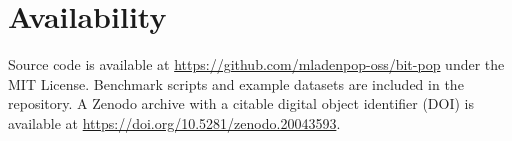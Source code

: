 \documentclass[10pt]{article}
\begin{document}
\section*{Availability}

Source code is available at \url{https://github.com/mladenpop-oss/bit-pop} under the MIT License. Benchmark scripts and example datasets are included in the repository. A Zenodo archive with a citable digital object identifier (DOI) is available at \url{https://doi.org/10.5281/zenodo.20043593}.



\end{document}
